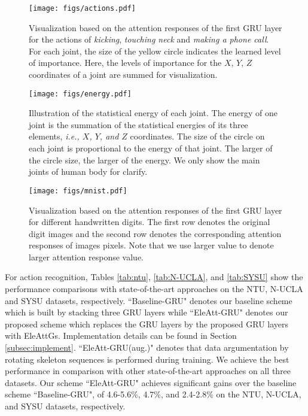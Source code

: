 \documentclass[journal]{IEEEtran}
\newcommand{\EleAttGn}{{EleAttG}}
\begin{document}
\begin{figure*}[th]
	\centering
	\texttt{[image: figs/actions.pdf]}
	\caption{Visualization based on the attention responses of the first GRU layer for the actions of \emph{kicking}, \emph{touching neck} and \emph{making a phone call}. For each joint, the size of the yellow circle indicates the learned level of importance. Here, the levels of importance for the $X$, $Y$, $Z$ coordinates of a joint are summed for visualization.}	
	\label{fig:vis}
\end{figure*}

\begin{figure}[!]
	\centering
	\texttt{[image: figs/energy.pdf]}
	\caption{Illustration of the statistical energy of each joint. The energy of one joint is the summation of the statistical energies of its three elements, {\it i.e., $X$, $Y$, and $Z$} coordinates. The size of the circle on each joint is proportional to the energy of that joint. The larger of the circle size, the larger of the energy. We only show the main joints of human body for clarify.}	
	\label{fig:energy}
\end{figure}


\begin{figure*}[th]
	\centering
	\texttt{[image: figs/mnist.pdf]}
	\caption{Visualization based on the attention responses of the first GRU layer for different handwritten digits. The first row denotes the original digit images and the second row denotes the corresponding attention responses of images pixels. Note that we use larger value to denote larger attention response value.}	
	\label{fig:mnist}
\end{figure*}

For action recognition, Tables \ref{tab:ntu}, \ref{tab:N-UCLA}, and \ref{tab:SYSU} show the performance comparisons with state-of-the-art approaches on the NTU, N-UCLA and SYSU datasets, respectively. ``Baseline-GRU" denotes our baseline scheme which is built by stacking three GRU layers while ``EleAtt-GRU" denotes our proposed scheme which replaces the GRU layers by the proposed GRU layers with {\EleAttGn}s. Implementation details can be found in Section \ref{subsec:implement}.  ``EleAtt-GRU(aug.)" denotes that data argumentation by rotating skeleton sequences is performed during training. We achieve the best performance in comparison with other state-of-the-art approaches on all three datasets. Our scheme ``EleAtt-GRU" achieves significant gains over the baseline scheme ``Baseline-GRU", of 4.6-5.6\%, 4.7\%, and 2.4-2.8\% on the NTU, N-UCLA, and SYSU datasets, respectively. 
\end{document}
